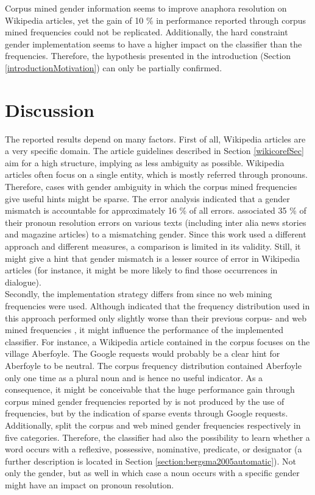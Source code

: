Corpus mined gender information seems to improve anaphora resolution on Wikipedia articles, yet the gain of 10 \% in performance \cite{bergsma2005automatic} reported through corpus mined frequencies could not be replicated. Additionally, the hard constraint gender implementation seems to have a higher impact on the classifier than the frequencies. Therefore, the hypothesis presented in the introduction (Section \ref{introductionMotivation}) can only be partially confirmed. 

\section{Discussion}
\label{discussion}
The reported results depend on many factors. First of all, Wikipedia articles are a very specific domain. The article guidelines described in Section \ref{wikicorefSec} aim for a high structure, implying as less ambiguity as possible. Wikipedia articles often focus on a single entity, which is mostly referred through pronouns. Therefore, cases with gender ambiguity in which the corpus mined frequencies give useful hints might be sparse. The error analysis indicated that a gender mismatch is accountable for approximately 16 \% of all errors. \cite{kennedy1996anaphora} associated 35 \% of their pronoun resolution errors on various texts (including inter alia news stories and magazine articles) to a mismatching gender. Since this work used a different approach and different measures, a comparison is limited in its validity. Still, it might give a hint that gender mismatch is a lesser source of error in Wikipedia articles (for instance, it might be more likely to find those occurrences in dialogue).\\
Secondly, the implementation strategy differs from \cite{bergsma2005automatic} since no web mining frequencies were used. Although \cite{Bergsma:06} indicated that the frequency distribution used in this approach performed only slightly worse than their previous corpus- and web mined frequencies \citep{bergsma2005automatic}, it might influence the performance of the implemented classifier. For instance, a Wikipedia article contained in the corpus focuses on the village Aberfoyle. The Google requests would probably be a clear hint for Aberfoyle to be neutral. The corpus frequency distribution contained Aberfoyle only one time as a plural noun and is hence no useful indicator. As a consequence, it might be conceivable that the huge performance gain through corpus mined gender frequencies reported by \cite{bergsma2005automatic} is not produced by the use of frequencies, but by the indication of sparse events through Google requests.\\
Additionally, \cite{bergsma2005automatic} split the corpus and web mined gender frequencies respectively in five categories. Therefore, the classifier had also the possibility to learn whether a word occurs with a reflexive, possessive, nominative, predicate, or designator (a further description is located in Section \ref{section:bergsma2005automatic}). Not only the gender, but as well in which case a noun occurs with a specific gender might have an impact on pronoun resolution.

